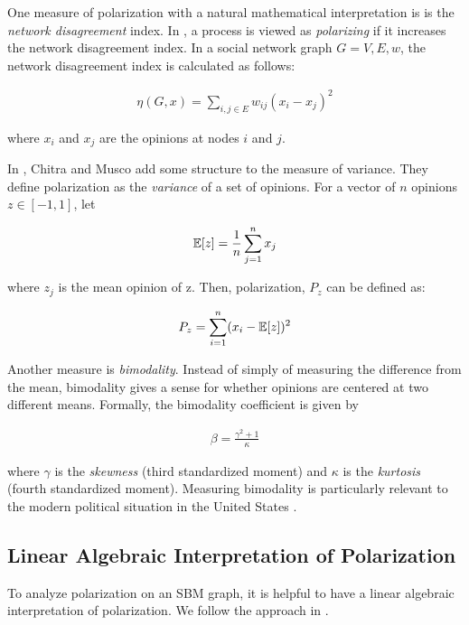 One measure of polarization with a natural mathematical interpretation is is the \emph{network disagreement} index. In \cite{Dandekarpnas}, a process is viewed as \emph{polarizing} if it increases the network disagreement index. In a social network graph $G = {V,E,w}$, the network disagreement index is calculated as follows:

\begin{align}
    \eta(G,x) = \sum_{i,j \in E} w_{ij}(x_i - x_j)^2 
    \nonumber
\end{align}

where $x_i$ and $x_j$ are the opinions at nodes $i$ and $j$.

In \cite{chitra20analyzing}, Chitra and Musco add some structure to the measure of variance. They define polarization as the \emph{variance} of a set of opinions. For a vector of $n$ opinions ${z} \in [-1,1]$, let

\begin{align}
    \operatorname*{\mathbb{E}}[{z}] = \frac{1}{n}\sum_{j=1}^n x_j 
    \nonumber
\end{align}

where $z_j$ is the mean opinion of {z}. Then, polarization, $P_z$ can be defined as:

\begin{align}
    P_z = \sum_{i=1}^n (x_i - \operatorname*{\mathbb{E}}[{z}])^2
    \nonumber
\end{align}

Another measure is \emph{bimodality}.
Instead of simply of measuring the difference from the mean,
bimodality gives a sense for whether opinions are centered
at two different means.
Formally, the bimodality coefficient is given by

\begin{align}
    \beta = \frac{\gamma^2 + 1}{\kappa}
    \nonumber
\end{align}

\noindent where $\gamma$ is the \emph{skewness} (third standardized moment) and $\kappa$ is the \emph{kurtosis} (fourth standardized moment). 
Measuring bimodality is particularly relevant to
the modern political situation in the United States
\cite{bromley2017tale}.

\subsection{Linear Algebraic Interpretation of Polarization} 
To analyze polarization on an SBM graph, it is helpful to have a linear algebraic interpretation of polarization. We follow the approach in  \cite{chitra20analyzing}.

